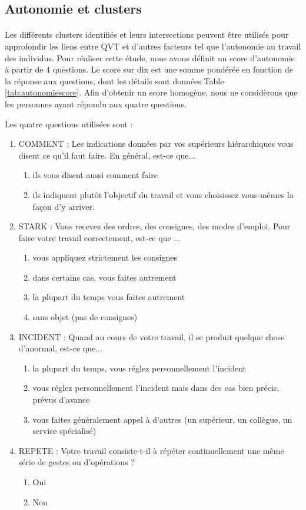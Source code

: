 \documentclass[11pt,fleqn,a4paper,openany,frenchb]{book} %
\begin{document}
\subsection{Autonomie et clusters}
\paragraph{}
Les différents clusters identifiés et leurs intersections peuvent être utilisés pour approfondir les liens entre QVT et d'autres facteurs tel que l'autonomie au travail des individus.
Pour réaliser cette étude, nous avons définit un score d'autonomie à partir de 4 questions. Le score sur dix est une somme pondérée en fonction de la réponse aux questions, dont les détails sont données Table \ref{tab:autonomiescore}. Afin d'obtenir un score homogène, nous ne considèrons que les personnes ayant répondu aux quatre questions. 

Les quatre questions utilisées sont : 
\begin{enumerate}
\item COMMENT : Les indications données par vos supérieurs hiérarchiques vous disent ce qu'il faut faire. En général, est-ce que...
    \begin{enumerate}
    \item ils vous disent aussi comment faire
    \item ils indiquent plutôt l'objectif du travail et vous choisissez vous-mêmes la façon d'y arriver.
    \end{enumerate}
\item STARK : Vous recevez des ordres, des consignes, des modes d'emploi. Pour faire votre travail correctement, est-ce que ...
    \begin{enumerate}
    \item  vous appliquez strictement les consignes
    \item dans certains cas, vous faites autrement
    \item la plupart du temps vous faites autrement
    \item sans objet (pas de consignes)
    \end{enumerate}
\item INCIDENT : Quand au cours de votre travail, il se produit quelque chose d'anormal, est-ce que...
    \begin{enumerate}
    \item la plupart du temps, vous réglez personnellement l'incident
    \item vous réglez personnellement l’incident mais dans des cas bien précis, prévus
    d’avance
    \item vous faites généralement appel à d'autres (un supérieur, un collègue, un service
    spécialisé)
    \end{enumerate}
\item REPETE : Votre travail consiste-t-il à répéter continuellement une même série de gestes ou d'opérations ?
    \begin{enumerate}
    \item Oui
    \item Non
    \end{enumerate}
\end{enumerate}
\end{document}
